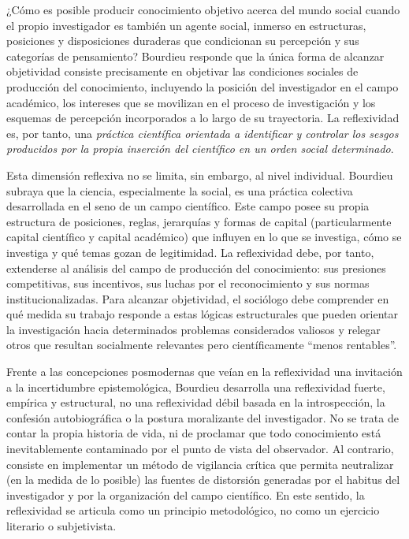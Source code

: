 \documentclass[
  spanish,
  letterpaper,
  DIV=11,
  numbers=noendperiod]{scrreprt}
\begin{document}
¿Cómo es posible producir conocimiento objetivo acerca del mundo social
cuando el propio investigador es también un agente social, inmerso en
estructuras, posiciones y disposiciones duraderas que condicionan su
percepción y sus categorías de pensamiento? Bourdieu responde que la
única forma de alcanzar objetividad consiste precisamente en objetivar
las condiciones sociales de producción del conocimiento, incluyendo la
posición del investigador en el campo académico, los intereses que se
movilizan en el proceso de investigación y los esquemas de percepción
incorporados a lo largo de su trayectoria. La reflexividad es, por
tanto, una \emph{práctica científica orientada a identificar y controlar
los sesgos producidos por la propia inserción del científico en un orden
social determinado}.

Esta dimensión reflexiva no se limita, sin embargo, al nivel individual.
Bourdieu subraya que la ciencia, especialmente la social, es una
práctica colectiva desarrollada en el seno de un campo científico. Este
campo posee su propia estructura de posiciones, reglas, jerarquías y
formas de capital (particularmente capital científico y capital
académico) que influyen en lo que se investiga, cómo se investiga y qué
temas gozan de legitimidad. La reflexividad debe, por tanto, extenderse
al análisis del campo de producción del conocimiento: sus presiones
competitivas, sus incentivos, sus luchas por el reconocimiento y sus
normas institucionalizadas. Para alcanzar objetividad, el sociólogo debe
comprender en qué medida su trabajo responde a estas lógicas
estructurales que pueden orientar la investigación hacia determinados
problemas considerados valiosos y relegar otros que resultan socialmente
relevantes pero científicamente ``menos rentables''.

Frente a las concepciones posmodernas que veían en la reflexividad una
invitación a la incertidumbre epistemológica, Bourdieu desarrolla una
reflexividad fuerte, empírica y estructural, no una reflexividad débil
basada en la introspección, la confesión autobiográfica o la postura
moralizante del investigador. No se trata de contar la propia historia
de vida, ni de proclamar que todo conocimiento está inevitablemente
contaminado por el punto de vista del observador. Al contrario, consiste
en implementar un método de vigilancia crítica que permita neutralizar
(en la medida de lo posible) las fuentes de distorsión generadas por el
habitus del investigador y por la organización del campo científico. En
este sentido, la reflexividad se articula como un principio
metodológico, no como un ejercicio literario o subjetivista.
\end{document}
